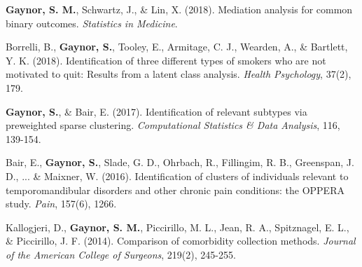 

\begin{cvpapers}

\cvpaper
    {\textbf{Gaynor, S. M.}, Schwartz, J., \& Lin, X. (2018). Mediation analysis for common binary outcomes. \textit{Statistics in Medicine}.} %
    {} %
    { } %
    {} %
    
    \cvpaper
    {Borrelli, B., \textbf{Gaynor, S.}, Tooley, E., Armitage, C. J., Wearden, A., \& Bartlett, Y. K. (2018). Identification of three different types of smokers who are not motivated to quit: Results from a latent class analysis. \textit{Health Psychology}, 37(2), 179.} %
    {} %
    { } %
    {} %
    
    
  \cvpaper
    {\textbf{Gaynor, S.}, \& Bair, E. (2017). Identification of relevant subtypes via preweighted sparse clustering. \textit{Computational Statistics \& Data Analysis}, 116, 139-154.} %
    {} %
    { } %
    {} %
    
 \cvpaper
    {Bair, E., \textbf{Gaynor, S.}, Slade, G. D., Ohrbach, R., Fillingim, R. B., Greenspan, J. D., ... \& Maixner, W. (2016). Identification of clusters of individuals relevant to temporomandibular disorders and other chronic pain conditions: the OPPERA study. \textit{Pain}, 157(6), 1266.} %
    {} %
    { } %
    {} %
    
 \cvpaper
    {Kallogjeri, D., \textbf{Gaynor, S. M.}, Piccirillo, M. L., Jean, R. A., Spitznagel, E. L., \& Piccirillo, J. F. (2014). Comparison of comorbidity collection methods. \textit{Journal of the American College of Surgeons}, 219(2), 245-255.} %
    {} %
    { } %
    {} %
    
    

\end{cvpapers}


